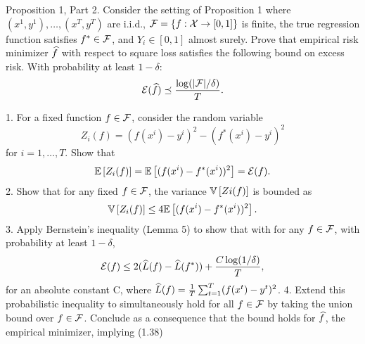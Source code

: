 \begin{exercise}[]{Proposition 1, Part 2.}
Consider the setting of Proposition 1 where $ (x^{1}, y^{1}),\ldots,(x^{T},y^{T})$ are i.i.d., $\mathcal{F} = \{f : \mathcal{X} \to [0,1] \}$ is finite,  
the true regression function satisfies $f^* \in \mathcal{F}$, and $Y_i \in [0, 1]$ almost surely. Prove that empirical risk minimizer $\widehat f$ with respect 
to square loss satisfies the following bound on excess risk. With probability at least $1 - \delta$:
\begin{equation*}
    \mathcal{E}(\widehat f) \preceq \frac{\log(|\mathcal{F}|/\delta)}{T}.
\end{equation*}
\end{exercise}

1. For a fixed function $f \in \mathcal{F}$, consider the random variable 
\[Z_i(f) = (f(x^i)-y^i)^2 -(f^*(x^i)-y^i)^2\]
 for $i=1,\ldots,T.$ Show that
 \[ \mathbb{E}\left[Z_i(f)\right] = \mathbb{E}\left[(f(x^i)- f^*(x^i))^2\right] = \mathcal{E}(f).\]
2. Show that for any fixed $f \in \mathcal{F}$, the variance $\mathbb{V}\left[Zi(f)\right]$ is bounded as
\[ \mathbb{V}\left[Z_i(f)\right]\leq 4\mathbb{E}\left[(f(x^i)-f^*(x^i))^2\right].\]
3. Apply Bernstein’s inequality (Lemma 5) to show that with for any $f \in \mathcal{F}$, with probability
at least $1-\delta$,
\[ \mathcal{E}(f) \leq 2(\widehat L(f)-\widehat L(f^*))+\frac{C \log(1/\delta)}{T},\] 
for an absolute constant C, where $\widehat L(f) = \frac{1}{T} \sum_{t=1}^T (f(x^t) - y^t)^2$.
4. Extend this probabilistic inequality to simultaneously hold for all $f \in \mathcal{F}$ by taking the 
union bound over $f \in \mathcal{F}$. Conclude as a consequence that the bound holds for $\widehat f$, the empirical minimizer, implying (1.38)
